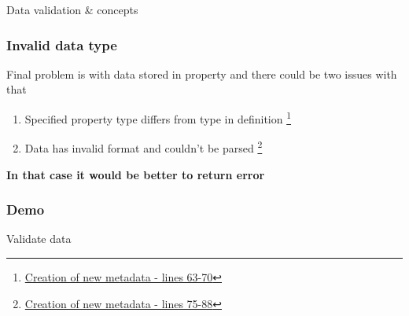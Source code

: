 \documentclass{beamer}
\begin{document}
\begin{section}{Data validation \& concepts}
\begin{frame}
\frametitle{Invalid data type}
Final problem is with data stored in property and there could be two issues with that \pause
\begin{enumerate}
	\item Specified property type differs from type in definition \footnote[1]{\href{https://github.com/paqaos/DynamicMetadata-SFI2021/blob/main/MovieDatabase/MovieDatabase/CommandStack/CommandHandlers/MovieMetadatas/CreateMovieMetadataCommandHandler.cs}{Creation of new metadata - lines 63-70}} \pause
	\item Data has invalid format and couldn't be parsed \footnote[2]{\href{https://github.com/paqaos/DynamicMetadata-SFI2021/blob/main/MovieDatabase/MovieDatabase/CommandStack/CommandHandlers/MovieMetadatas/CreateMovieMetadataCommandHandler.cs}{Creation of new metadata - lines 75-88}} \pause
\end{enumerate}
\pause
\textbf{In that case it would be better to return error}
\end{frame}

\begin{frame}
\frametitle{Demo}
Validate data
\end{frame}

\end{section}
\end{document}
